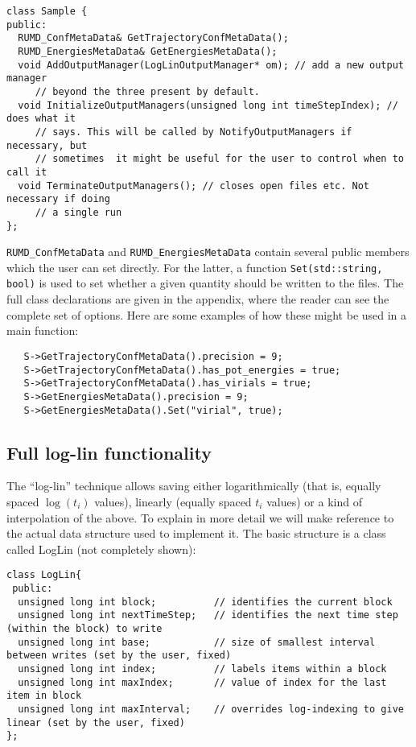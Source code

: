 \documentclass[a4paper]{article}
\begin{document}
\begin{verbatim}
class Sample {
public:
  RUMD_ConfMetaData& GetTrajectoryConfMetaData();
  RUMD_EnergiesMetaData& GetEnergiesMetaData();
  void AddOutputManager(LogLinOutputManager* om); // add a new output manager 
     // beyond the three present by default.
  void InitializeOutputManagers(unsigned long int timeStepIndex); // does what it
     // says. This will be called by NotifyOutputManagers if necessary, but 
     // sometimes  it might be useful for the user to control when to call it
  void TerminateOutputManagers(); // closes open files etc. Not necessary if doing
     // a single run
};
\end{verbatim}

\verb|RUMD_ConfMetaData| and \verb|RUMD_EnergiesMetaData| contain several 
public members which the user can set directly. For the latter, a function \verb|Set(std::string, bool)| is used to set whether a given quantity should be 
written to the files. The full class declarations are given in the 
appendix, where the reader can see the complete set of options.
Here are some examples of how these might be used in a main function:

\begin{verbatim}
   S->GetTrajectoryConfMetaData().precision = 9;
   S->GetTrajectoryConfMetaData().has_pot_energies = true;
   S->GetTrajectoryConfMetaData().has_virials = true;
   S->GetEnergiesMetaData().precision = 9;
   S->GetEnergiesMetaData().Set("virial", true);
\end{verbatim}

\subsection{Full log-lin  functionality}

The ``log-lin'' technique allows saving either logarithmically
(that is, equally spaced $\log(t_i)$ values), linearly (equally spaced $t_i$
values) or a kind of interpolation of the above. 
 To explain in more detail we will make reference to the
actual data structure used to implement it. The basic structure is a class
called LogLin (not completely shown):

\begin{verbatim}
class LogLin{
 public:
  unsigned long int block;          // identifies the current block
  unsigned long int nextTimeStep;   // identifies the next time step (within the block) to write
  unsigned long int base;           // size of smallest interval between writes (set by the user, fixed)
  unsigned long int index;          // labels items within a block
  unsigned long int maxIndex;       // value of index for the last item in block
  unsigned long int maxInterval;    // overrides log-indexing to give linear (set by the user, fixed)
};
\end{verbatim}
\end{document}
